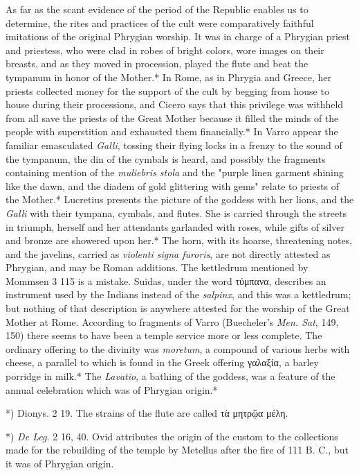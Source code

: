 \documentclass[a4paper, 11pt, oneside, polutonikogreek, english]{article}
\begin{document}
As far as the scant evidence of the period of the Republic enables us to determine, the rites and practices of the cult were comparatively faithful imitations of the original Phrygian worship. It was in charge of a Phrygian priest and priestess, who were clad in robes of bright colors, wore images on their breasts, and as they moved in procession, played the flute and beat the tympanum in honor of the Mother.* In Rome, as in Phrygia and Greece, her priests collected money for the support of the cult by begging from house to house during their processions, and Cicero says that this privilege was withheld from all save the priests of the Great Mother because it filled the minds of the people with superstition and exhausted them financially.* In Varro appear the familiar emasculated \emph{Galli}, tossing their flying locks in a frenzy to the sound of the tympanum, the din of the cymbals is heard, and possibly the fragments containing mention of the \emph{muliebris stola} and the "purple linen garment shining like the dawn, and the diadem of gold glittering with gems" relate to priests of the Mother.* Lucretius presents the picture of the goddess with her lions, and the \emph{Galli} with their tympana, cymbals, and flutes. She is carried through the streets in triumph, herself and her attendants garlanded with roses, while gifts of silver and bronze are showered upon her.* The horn, with its hoarse, threatening notes, and the javelins, carried as \emph{violenti signa furoris}, are not directly attested as Phrygian, and may be Roman additions. The kettledrum mentioned by Mommsen 3 115 is a mistake. Suidas, under the word τύμπανα, describes an instrument used by the Indians instead of the \emph{salpinx}, and this was a kettledrum; but nothing of that description is anywhere attested for the worship of the Great Mother at Rome. According to fragments of Varro (Buecheler's \emph{Men. Sat}, 149, 150) there seems to have been a temple service more or less complete. The ordinary offering to the divinity was \emph{moretum}, a compound of various herbs with cheese, a parallel to which is found in the Greek offering γαλαξία, a barley porridge in milk.* The \emph{Lavatio}, a bathing of the goddess, was a feature of the annual celebration which was of Phrygian origin.*

*) Dionys. 2 19. The strains of the flute are called τὰ μητρῷα μέλη.

*) \emph{De Leg.} 2 16, 40. Ovid attributes the origin of the custom to the collections made for the rebuilding of the temple by Metellus after the fire of 111 B. C., but it was of Phrygian origin.
\end{document}
